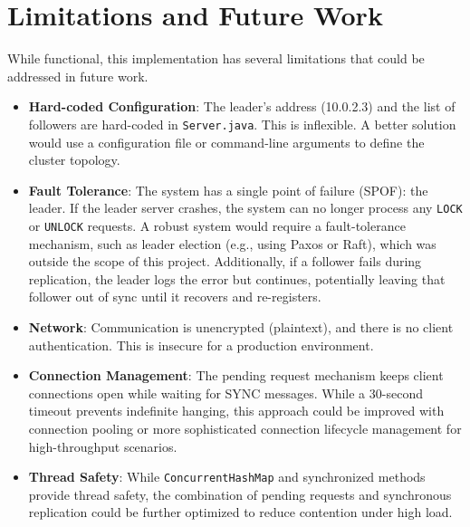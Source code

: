 \documentclass[a4paper,11pt]{article}
\begin{document}
\section{Limitations and Future Work}
While functional, this implementation has several limitations that could be addressed in future work.
\begin{itemize}
    \item \textbf{Hard-coded Configuration}: The leader's address (10.0.2.3) and the list of followers are hard-coded in \texttt{Server.java}. This is inflexible. A better solution would use a configuration file or command-line arguments to define the cluster topology.
    \item \textbf{Fault Tolerance}: The system has a single point of failure (SPOF): the leader. If the leader server crashes, the system can no longer process any \texttt{LOCK} or \texttt{UNLOCK} requests. A robust system would require a fault-tolerance mechanism, such as leader election (e.g., using Paxos or Raft), which was outside the scope of this project. Additionally, if a follower fails during replication, the leader logs the error but continues, potentially leaving that follower out of sync until it recovers and re-registers.
    \item \textbf{Network}: Communication is unencrypted (plaintext), and there is no client authentication. This is insecure for a production environment.
    \item \textbf{Connection Management}: The pending request mechanism keeps client connections open while waiting for SYNC messages. While a 30-second timeout prevents indefinite hanging, this approach could be improved with connection pooling or more sophisticated connection lifecycle management for high-throughput scenarios.
    \item \textbf{Thread Safety}: While \texttt{ConcurrentHashMap} and synchronized methods provide thread safety, the combination of pending requests and synchronous replication could be further optimized to reduce contention under high load.
\end{itemize}
\end{document}
